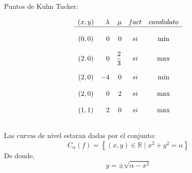 \begin{enumerate}
\begin{itemize}
\begin{itemize}
		\end{itemize}

	\end{itemize}

	Puntos de Kuhn Tucker:

	$$
	\begin{array}{*{5}{crrcc}}
	    (x,y) & \lambda & \mu & fact & candidato\\
	    \hline\\
	    (0,0)&0&0&si&\min\\\\
	    (2,0)&0&\dfrac{2}{3}&si&\max\\\\
	    (2,0)&-4&0&si&\min\\\\
	    (2,0)&0&2&si&\max\\\\
	    (1,1)&2&0&si&\max\\\\

	\end{array}
	$$

	Las curvas de nivel estaran dadas por el conjunto:
	$$C_\alpha (f) = \left\{ (x,y) \in \mathbb{R} \; | \; x^2+y^2=\alpha \right\}$$
	De donde,
	$$y=\pm\sqrt{\alpha -x^2}$$


\end{enumerate}
